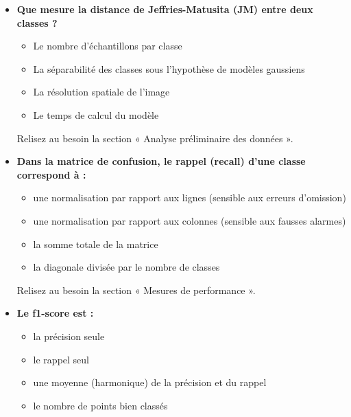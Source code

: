 \documentclass[
  french,
  11pt,
  letterpaper,
  open=any,
  twoside=false,
  french]{scrbook}
\providecommand{\tightlist}{%
  \setlength{\itemsep}{0pt}\setlength{\parskip}{0pt}}
\begin{document}
\begin{itemize}
  \begin{itemize}
  \tightlist
  \item
    normalisé
  \item
    déséquilibré
  \item
    orthogonal
  \item
    supervisé
  \end{itemize}

  Relisez au besoin la section « Construction d'un ensemble
  d'entraînement ».
\item
  \textbf{Que mesure la distance de Jeffries-Matusita (JM) entre deux
  classes ?}

  \begin{itemize}
  \tightlist
  \item
    Le nombre d'échantillons par classe
  \item
    La séparabilité des classes sous l'hypothèse de modèles gaussiens
  \item
    La résolution spatiale de l'image
  \item
    Le temps de calcul du modèle
  \end{itemize}

  Relisez au besoin la section « Analyse préliminaire des données ».
\item
  \textbf{Dans la matrice de confusion, le rappel (recall) d'une classe
  correspond à :}

  \begin{itemize}
  \tightlist
  \item
    une normalisation par rapport aux lignes (sensible aux erreurs
    d'omission)
  \item
    une normalisation par rapport aux colonnes (sensible aux fausses
    alarmes)
  \item
    la somme totale de la matrice
  \item
    la diagonale divisée par le nombre de classes
  \end{itemize}

  Relisez au besoin la section « Mesures de performance ».
\item
  \textbf{Le f1-score est :}

  \begin{itemize}
  \tightlist
  \item
    la précision seule
  \item
    le rappel seul
  \item
    une moyenne (harmonique) de la précision et du rappel
  \item
    le nombre de points bien classés
  \end{itemize}


\end{itemize}
\end{document}
